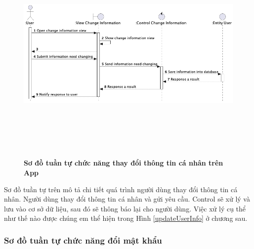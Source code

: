   \begin{figure}[H]
        \centering
        \includegraphics[width=16cm,height=11cm]{Images/mobile_app/change_user_information.png}
        \caption[Sơ đồ tuần tự chức năng thay đổi thông tin cá nhân trên App]{\bfseries \fontsize{12pt}{0pt}
        \selectfont Sơ đồ tuần tự chức năng thay đổi thông tin cá nhân trên App}
        \label{change_user_information} %
  \end{figure}

  Sơ đồ tuần tự trên mô tả chi tiết quá trình người dùng thay đổi thông tin cá nhân. Người dùng thay đổi thông tin cá nhân
  và gửi yêu cầu. Control sẽ xử lý và lưu vào cơ sở dữ liệu, sau đó sẽ thông báo lại cho người dùng.
  Việc xử lý cụ thể như thế nào được chúng em thể hiện trong Hình \ref{updateUserInfo} ở chương sau.

  \subsubsection{Sơ đồ tuần tự chức năng đổi mật khẩu}
\mbox{}

